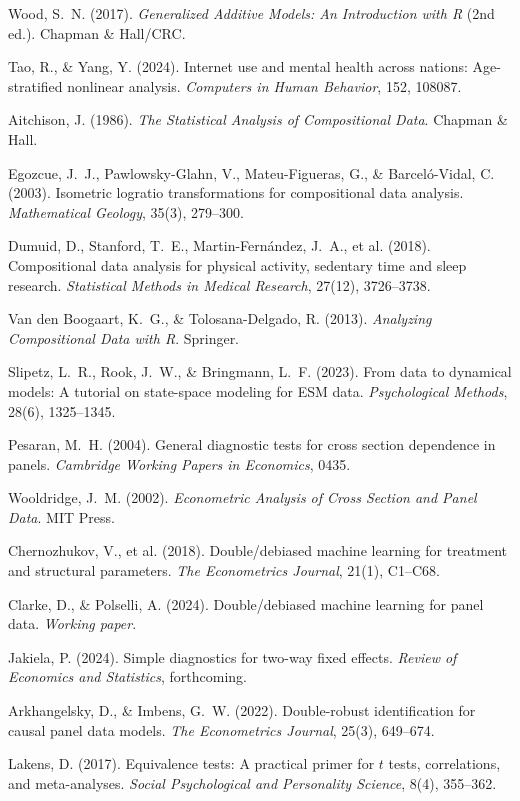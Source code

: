 \documentclass[a4paper,11pt,titlepage]{article}
\begin{document}
\begin{small}
\begin{enumerate}[label={[\arabic*]}, leftmargin=2em, itemsep=2pt]
  \item Wood, S.~N. (2017). \textit{Generalized Additive Models: An Introduction with R} (2nd ed.). Chapman \& Hall/CRC.
  \item Tao, R., \& Yang, Y. (2024). Internet use and mental health across nations: Age-stratified nonlinear analysis. \textit{Computers in Human Behavior}, 152, 108087.
  \item Aitchison, J. (1986). \textit{The Statistical Analysis of Compositional Data}. Chapman \& Hall.
  \item Egozcue, J.~J., Pawlowsky-Glahn, V., Mateu-Figueras, G., \& Barcel\'o-Vidal, C. (2003). Isometric logratio transformations for compositional data analysis. \textit{Mathematical Geology}, 35(3), 279--300.
  \item Dumuid, D., Stanford, T.~E., Martin-Fern\'andez, J.~A., et al. (2018). Compositional data analysis for physical activity, sedentary time and sleep research. \textit{Statistical Methods in Medical Research}, 27(12), 3726--3738.
  \item Van den Boogaart, K.~G., \& Tolosana-Delgado, R. (2013). \textit{Analyzing Compositional Data with R}. Springer.
  \item Slipetz, L.~R., Rook, J.~W., \& Bringmann, L.~F. (2023). From data to dynamical models: A tutorial on state-space modeling for ESM data. \textit{Psychological Methods}, 28(6), 1325--1345.
  \item Pesaran, M.~H. (2004). General diagnostic tests for cross section dependence in panels. \textit{Cambridge Working Papers in Economics}, 0435.
  \item Wooldridge, J.~M. (2002). \textit{Econometric Analysis of Cross Section and Panel Data}. MIT Press.
  \item Chernozhukov, V., et al. (2018). Double/debiased machine learning for treatment and structural parameters. \textit{The Econometrics Journal}, 21(1), C1--C68.
  \item Clarke, D., \& Polselli, A. (2024). Double/debiased machine learning for panel data. \textit{Working paper}.
  \item Jakiela, P. (2024). Simple diagnostics for two-way fixed effects. \textit{Review of Economics and Statistics}, forthcoming.
  \item Arkhangelsky, D., \& Imbens, G.~W. (2022). Double-robust identification for causal panel data models. \textit{The Econometrics Journal}, 25(3), 649--674.
  \item Lakens, D. (2017). Equivalence tests: A practical primer for $t$ tests, correlations, and meta-analyses. \textit{Social Psychological and Personality Science}, 8(4), 355--362.

\end{enumerate}
\end{small}
\end{document}
